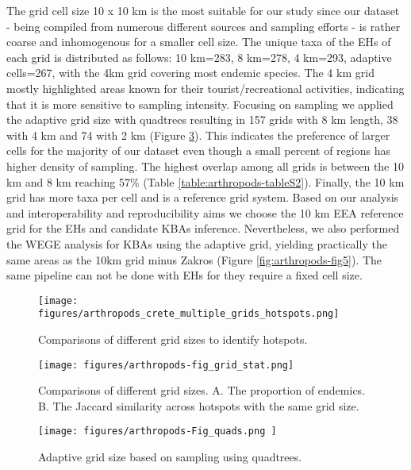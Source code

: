 The grid cell size 10 x 10 km is the most suitable for our study since our
dataset - being compiled from numerous different sources and sampling efforts -
is rather coarse and inhomogenous for a smaller cell size.
The unique taxa of the EHs of each grid is distributed as follows: 10 km=283,
8 km=278, 4 km=293, adaptive cells=267, with the 4km grid covering most endemic
species. The 4 km grid mostly highlighted areas known for their tourist/recreational activities,
indicating that it is more sensitive to sampling intensity.
Focusing on sampling we applied the adaptive grid size with quadtrees resulting
in 157 grids with 8 km length, 38 with 4 km and 74 with 2 km (Figure \ref{fig:arthropods-figS5}).
This indicates the preference of larger cells for the majority of our dataset
even though a small percent of regions has higher density of sampling.
The highest overlap among all grids is between the 10 km and 8 km reaching
57\% (Table \ref{table:arthropods-tableS2}). Finally, the 10 km grid has more taxa
per cell and is a reference grid system.
Based on our analysis and interoperability and reproducibility aims we choose
the 10 km EEA reference grid for the EHs and candidate KBAs inference.
Nevertheless, we also performed the WEGE analysis for KBAs using the adaptive
grid, yielding practically the same areas as the 10km grid minus Zakros (Figure \ref{fig:arthropods-fig5}).
The same pipeline can not be done with EHs for they require a fixed cell size.


   \begin{figure}[htp!]
      \centering
      \texttt{[image: figures/arthropods\_crete\_multiple\_grids\_hotspots.png]}
      \caption[Comparisons of different grid sizes]{Comparisons of different grid sizes to identify hotspots.}
      \label{fig:arthropods-different-hotposts}
   \end{figure}

   \begin{figure}[htp!]
      \centering
      \texttt{[image: figures/arthropods-fig\_grid\_stat.png]}
      \caption[Comparisons of proportions of endemics across grid sizes hotspots]{Comparisons of different grid sizes. A. The proportion of endemics. B. The Jaccard similarity across hotspots with the same grid size.}
      \label{fig:arthropods-different-hotposts-stat}
   \end{figure}


   \begin{figure}[htp!]
      \centering
      \texttt{[image: figures/arthropods-Fig\_quads.png ]}
      \caption[Adaptive grid size based on sampling using quadtrees]{Adaptive grid size based on sampling using quadtrees.}
      \label{fig:arthropods-figS5}
   \end{figure}

